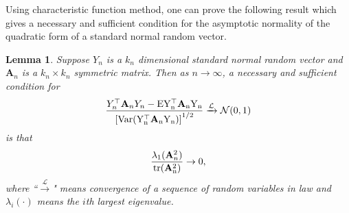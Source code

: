 \documentclass[times,sort&compress,3p]{elsarticle}
\newcommand{\mytr}{\rm tr}
\newcommand{\myE}{\rm E}
\newcommand{\myVar}{\rm Var}
\newcommand{\BA}{\mathbf{A}}    \newcommand{\BB}{\mathbf{B}}    \newcommand{\BC}{\mathbf{C}}    \newcommand{\BD}{\mathbf{D}}    \newcommand{\BE}{\mathbf{E}}    \newcommand{\BF}{\mathbf{F}}    \newcommand{\BG}{\mathbf{G}}    \newcommand{\BH}{\mathbf{H}}    \newcommand{\BI}{\mathbf{I}}    \newcommand{\BJ}{\mathbf{J}}    \newcommand{\BK}{\mathbf{K}}    \newcommand{\BL}{\mathbf{L}}
\theoremstyle{plain}
\newtheorem{lemma}{\quad\quad Lemma}
\theoremstyle{definition}
\theoremstyle{remark}
\begin{document}
Using characteristic function method, one can prove the following result which gives a necessary and sufficient condition for the asymptotic normality of the quadratic form of a standard normal random vector.
\begin{lemma}\label{quadraticFormCLT}
    Suppose $Y_{n}$ is a $k_n$ dimensional standard normal random vector and $\BA_n$ is a $k_n\times k_n$ symmetric matrix. Then as $n\to \infty$, a necessary and sufficient condition for
    \begin{equation}\label{quadratic}
        \frac{Y_n^\top  \BA_n Y_n-\myE Y_n^\top  \BA_n Y_n}{{[\myVar (Y_n^\top  \BA_n Y_n)]}^{1/2}}\xrightarrow{\mathcal{L}}\mathcal{N}(0,1)
    \end{equation}
    is that
    \begin{equation}\label{quadraticEigen}
        \frac{\lambda_{1}(\BA_n^2)}{\mytr(\BA_n^2)}\to 0,
    \end{equation}
    where ``$\xrightarrow{\mathcal{L}}$" means convergence of a sequence of random variables in law and $\lambda_{i}(\cdot)$ means the $i$th largest eigenvalue.
\end{lemma}
\end{document}
